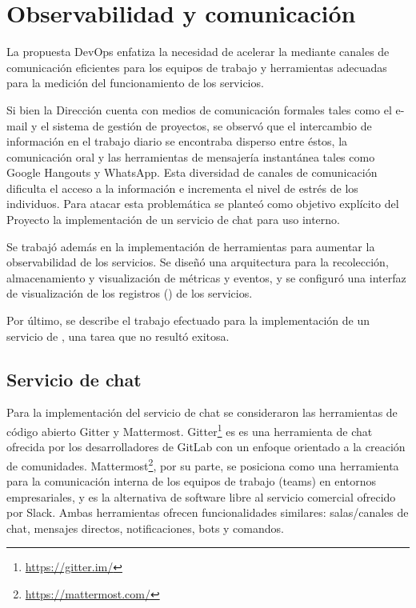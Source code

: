 \chapter{Observabilidad y comunicación}

La propuesta DevOps enfatiza la necesidad de acelerar la
 mediante canales de comunicación eficientes
para los equipos de trabajo y herramientas adecuadas para la medición
del funcionamiento de los servicios.

Si bien la Dirección cuenta con medios de comunicación formales tales
como el e-mail y el sistema de gestión de proyectos, se observó que el
intercambio de información en el trabajo diario se encontraba disperso
entre éstos, la comunicación oral y las herramientas de mensajería
instantánea tales como Google Hangouts y WhatsApp. Esta diversidad de
canales de comunicación dificulta el acceso a la información e
incrementa el nivel de estrés de los individuos. Para atacar esta
problemática se planteó como objetivo explícito del Proyecto la
implementación de un servicio de chat para uso interno.

Se trabajó además en la implementación de herramientas para aumentar
la observabilidad de los servicios. Se diseñó una arquitectura para la
recolección, almacenamiento y visualización de métricas y eventos, y
se configuró una interfaz de visualización de los registros
() de los servicios.

Por último, se describe el trabajo efectuado para la implementación de
un servicio de , una tarea que no
resultó exitosa.

\section{Servicio de chat}

Para la implementación del servicio de chat se consideraron las
herramientas de código abierto Gitter y Mattermost. Gitter\footnote{
  \href{https://gitter.im/}{https://gitter.im/}} es es una herramienta
de chat ofrecida por los desarrolladores de GitLab con un enfoque
orientado a la creación de comunidades. Mattermost\footnote{
  \href{https://mattermost.com/}{https://mattermost.com/} }, por su
parte, se posiciona como una herramienta para la comunicación interna
de los equipos de trabajo (teams) en entornos empresariales, y es la
alternativa de software libre al servicio comercial ofrecido por
Slack. Ambas herramientas ofrecen funcionalidades similares:
salas/canales de chat, mensajes directos, notificaciones, bots y
comandos.

